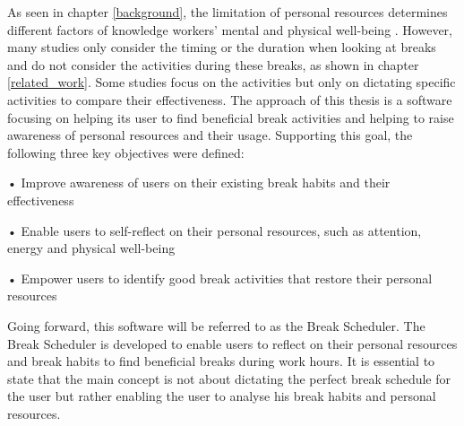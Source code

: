 \documentclass{hasel_thesis}
\begin{document}

As seen in chapter \ref{background}, the limitation of personal resources determines different factors of knowledge workers' mental and physical well-being \cite{Trougakos.2009}. However, many studies only consider the timing or the duration when looking at breaks and do not consider the activities during these breaks, as shown in chapter \ref{related_work}. Some studies focus on the activities but only on dictating specific activities to compare their effectiveness. The approach of this thesis is a software focusing on helping its user to find beneficial break activities and helping to raise awareness of personal resources and their usage. Supporting this goal, the following three key objectives were defined:

\begin{tcolorbox}[colback=white!5!white,colframe=black!75!black]
 •	Improve awareness of users on their existing break habits and their effectiveness

•	Enable users to self-reflect on their personal resources, such as attention, energy and physical well-being

•	Empower users to identify good break activities that restore their personal resources
\end{tcolorbox}



Going forward, this software will be referred to as the Break Scheduler. The Break Scheduler is developed to enable users to reflect on their personal resources and break habits to find beneficial breaks during work hours. It is essential to state that the main concept is not about dictating the perfect break schedule for the user but rather enabling the user to analyse his break habits and personal resources.
\end{document}
